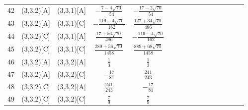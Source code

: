 \documentclass[11pt]{article}
\begin{document}
\begin{longtable}{ | p{1cm}| *{15}{c|} }
42 & (3,3,2)[A] & (3,3,1)[A] & $-\frac{7-4\sqrt{70}}{54}$ & $-\frac{17-2\sqrt{70}}{54}$\\
43 & (3,3,2)[A] & (3,3,1)[C] & $-\frac{119-4\sqrt{70}}{162}$ & $\frac{127+34\sqrt{70}}{486}$\\
44 & (3,3,2)[C] & (3,3,1)[A] & $\frac{17+56\sqrt{70}}{486}$ & $-\frac{119-4\sqrt{70}}{162}$\\
45 & (3,3,2)[C] & (3,3,1)[C] & $\frac{289+56\sqrt{70}}{1458}$ & $\frac{889+68\sqrt{70}}{1458}$\\
46 & (3,3,2)[A] & (3,3,2)[A] & $\frac{1}{3}$ & $\frac{1}{3}$\\
47 & (3,3,2)[A] & (3,3,2)[C] & $-\frac{17}{81}$ & $\frac{241}{243}$\\
48 & (3,3,2)[C] & (3,3,2)[A] & $\frac{241}{243}$ & $-\frac{17}{81}$\\
49 & (3,3,2)[C] & (3,3,2)[C] & $\frac{7}{9}$ & $\frac{7}{9}$\\
\end{longtable}
\end{document}
